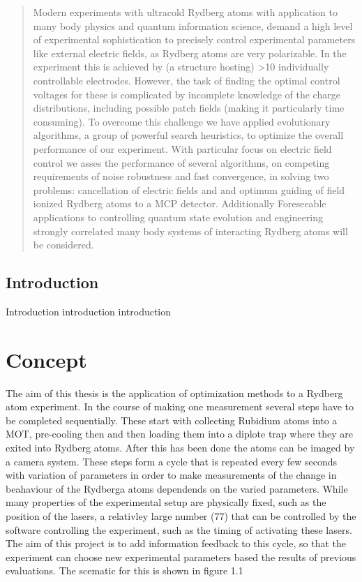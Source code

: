 \documentclass[a4paper,titlepage]{report}
\begin{document}
\begin{abstract}
Modern experiments with ultracold Rydberg atoms with application to many body physics and quantum information science, demand a  high level of experimental sophistication to precisely control experimental parameters like external electric fields, as Rydberg atoms are very  polarizable. In the experiment this is achieved by (a structure hosting) >10 individually controllable electrodes. However, the task of finding the optimal control voltages for these is complicated by incomplete knowledge of the charge distributions, including possible patch fields (making it particularly time consuming). To overcome this challenge we have applied evolutionary algorithms, a group of powerful search heuristics, to optimize the overall performance of our experiment. With particular focus on electric field control we asses the performance of several algorithms, on competing requirements of noise robustness and fast convergence, in solving two problems: cancellation of electric fields and and optimum guiding of field ionized Rydberg atoms to a MCP detector. Additionally Foreseeable applications to controlling quantum state evolution and engineering strongly correlated many body systems of interacting Rydberg atoms will be considered. 

\end{abstract}



\section*{Introduction}
Introduction introduction introduction

\tableofcontents

\chapter{Concept}

The aim of this thesis is the application of optimization methods to a Rydberg atom experiment. In the course of making one measurement several steps have to be completed sequentially. These start with collecting Rubidium atoms into a MOT, pre-cooling then and then loading them into a diplote trap where they are exited into Rydberg atoms. After this has been done the atoms can be imaged by a camera system. These steps form a cycle that is repeated every few seconds with variation of parameters in order to make measurements of the change in beahaviour of the Rydberga atoms dependends on the varied parameters. While many properties of the experimental setup are physically fixed, such as the position of the lasers, a relativley large number (77) that can be controlled by the software controlling the experiment, such as the timing of activating these lasers. The aim of this project is to add information feedback to this cycle, so that the experiment can choose new experimental parameters based the results of previous evaluations. The scematic for this is shown in figure 1.1
\end{document}
